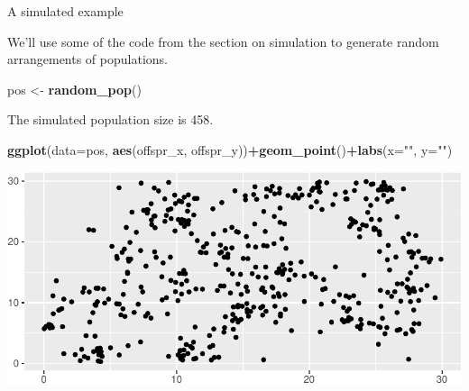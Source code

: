 \documentclass[
  ignorenonframetext,
]{beamer}
\newenvironment{Shaded}{\begin{snugshade}}{\end{snugshade}}
\newcommand{\DataTypeTok}[1]{\textcolor[rgb]{0.13,0.29,0.53}{#1}}
\newcommand{\KeywordTok}[1]{\textcolor[rgb]{0.13,0.29,0.53}{\textbf{#1}}}
\newcommand{\NormalTok}[1]{#1}
\newcommand{\OperatorTok}[1]{\textcolor[rgb]{0.81,0.36,0.00}{\textbf{#1}}}
\newcommand{\StringTok}[1]{\textcolor[rgb]{0.31,0.60,0.02}{#1}}
\begin{document}
\begin{frame}[fragile]{A simulated example}
\protect\hypertarget{a-simulated-example}{}

We'll use some of the code from the section on simulation to generate
random arrangements of populations.

\scriptsize

\begin{Shaded}
\begin{Highlighting}[]
\NormalTok{pos <-}\StringTok{ }\KeywordTok{random_pop}\NormalTok{()}
\end{Highlighting}
\end{Shaded}

\normalsize

The simulated population size is 458. \scriptsize

\begin{Shaded}
\begin{Highlighting}[]
\KeywordTok{ggplot}\NormalTok{(}\DataTypeTok{data=}\NormalTok{pos, }\KeywordTok{aes}\NormalTok{(offspr_x, offspr_y))}\OperatorTok{+}\KeywordTok{geom_point}\NormalTok{()}\OperatorTok{+}\KeywordTok{labs}\NormalTok{(}\DataTypeTok{x=}\StringTok{""}\NormalTok{, }\DataTypeTok{y=}\StringTok{""}\NormalTok{)}
\end{Highlighting}
\end{Shaded}

\includegraphics{distance_sampling_files/figure-beamer/unnamed-chunk-4-1.pdf}

\end{frame}
\end{document}
